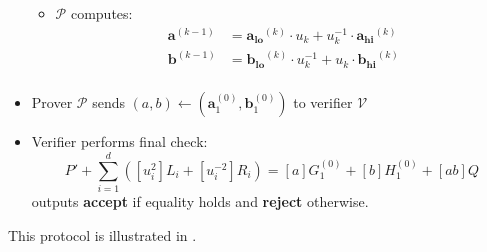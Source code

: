 \documentclass[../lecture-notes-148x210.tex]{subfiles}
\begin{document}
\begin{definition}
\begin{itemize}
\begin{itemize}
                \item $\mathcal{P}$ computes:
                    \begin{align*}
                        \mathbf{a}^{(k-1)} &= \mathbf{a_{lo}}^{(k)} \cdot u_k + u_k^{-1} \cdot \mathbf{a_{hi}}^{(k)} \\
                        \mathbf{b}^{(k-1)} &= \mathbf{b_{lo}}^{(k)} \cdot u_k^{-1} + u_k \cdot \mathbf{b_{hi}}^{(k)} \\
                    \end{align*}
            \end{itemize}
        \item Prover $\mathcal{P}$ sends $(a,b) \gets (\mathbf{a}_1^{(0)}, \mathbf{b}_1^{(0)})$ to verifier $\mathcal{V}$
        \item Verifier performs final check: 
            $$P' + \sum_{i=1}^d ([u_i^2]L_i + [u_i^{-2}]R_i) = [a]G_1^{(0)} + [b]H_1^{(0)} + [ab]Q$$
        outputs \textbf{accept} if equality holds and \textbf{reject} otherwise.
    \end{itemize}

    This protocol is illustrated in . 
\end{definition}
\end{document}
